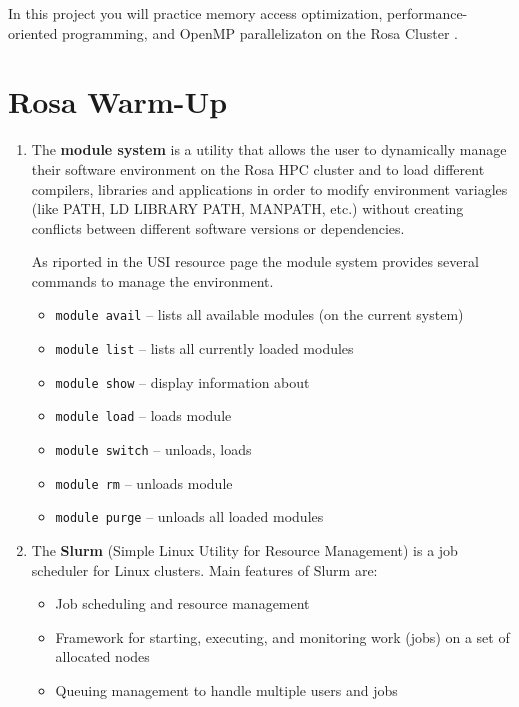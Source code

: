 \documentclass[unicode,11pt,a4paper,oneside,numbers=endperiod,openany]{scrartcl}
\begin{document}
\setassignment

\newline

\assignmentpolicy
In this project you will practice memory access optimization, performance-oriented programming, and OpenMP parallelizaton 
on the Rosa Cluster .  

\section{Rosa Warm-Up }

\begin{enumerate}
    \item %
    The \textbf{module system} is a utility that allows the user to dynamically manage their software environment on the Rosa HPC cluster and to load different compilers, libraries and applications in order to modify environment variagles (like PATH, LD LIBRARY PATH, MANPATH, etc.) without creating conflicts between different software versions or dependencies.    

    As riported in the USI resource page the module system provides several commands to manage the environment.

    \begin{itemize}
        \item \texttt{module avail} -- lists all available modules (on the current system)
        \item \texttt{module list} -- lists all currently loaded modules
        \item \texttt{module show} -- display information about
        \item \texttt{module load} -- loads module
        \item \texttt{module switch} -- unloads, loads
        \item \texttt{module rm} -- unloads module
        \item \texttt{module purge} -- unloads all loaded modules
    \end{itemize}

    \item %
    The \textbf{Slurm} (Simple Linux Utility for Resource Management) is a job scheduler for Linux clusters.
    Main features of Slurm are:
    \begin{itemize}
        \item Job scheduling and resource management
        \item Framework for starting, executing, and monitoring work (jobs) on a set of allocated nodes
        \item Queuing management to handle multiple users and jobs
    \end{itemize}


\end{enumerate}
\end{document}
